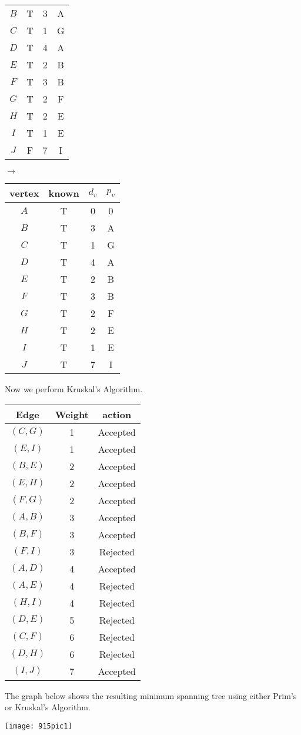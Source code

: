 \documentclass[12pt]{article}
\begin{document}
\begin{center}
\begin{tabular}{ c c c c }
$B$ & T & 3 & A \\
$C$ & T & 1 & G \\
$D$ & T & 4 & A \\
$E$ & T & 2 & B \\
$F$ & T & 3 & B \\
$G$ & T & 2 & F \\
$H$ & T & 2 & E \\
$I$ & T & 1 & E \\
$J$ & F & 7 & I \\
\end{tabular}
$\rightarrow$
\begin{tabular}{ c c c c } 
vertex & known & $d_v$ & $p_v$ \\
 \hline
$A$ & T & 0 & 0 \\
$B$ & T & 3 & A \\
$C$ & T & 1 & G \\
$D$ & T & 4 & A \\
$E$ & T & 2 & B \\
$F$ & T & 3 & B \\
$G$ & T & 2 & F \\
$H$ & T & 2 & E \\
$I$ & T & 1 & E \\
$J$ & T & 7 & I \\
\end{tabular}

\end{center}

\newpage

Now we perform Kruskal's Algorithm.
\begin{center}
\begin{tabular}{ c c c } 
Edge & Weight & action \\
 \hline
$(C,G)$ & 1 & Accepted \\
$(E,I)$ & 1 & Accepted \\
$(B,E)$ & 2 & Accepted \\
$(E,H)$ & 2 & Accepted \\
$(F,G)$ & 2 & Accepted \\
$(A,B)$ & 3 & Accepted \\
$(B,F)$ & 3 & Accepted \\
$(F,I)$ & 3 & Rejected \\
$(A,D)$ & 4 & Accepted \\
$(A,E)$ & 4 & Rejected \\
$(H,I)$ & 4 & Rejected \\
$(D,E)$ & 5 & Rejected \\
$(C,F)$ & 6 & Rejected \\
$(D,H)$ & 6 & Rejected \\
$(I,J)$ & 7 & Accepted \\
\end{tabular}
\end{center}
The graph below shows the resulting minimum spanning tree using either Prim's or Kruskal's Algorithm.
\begin{center}
\texttt{[image: 915pic1]}
\end{center}
\end{document}
